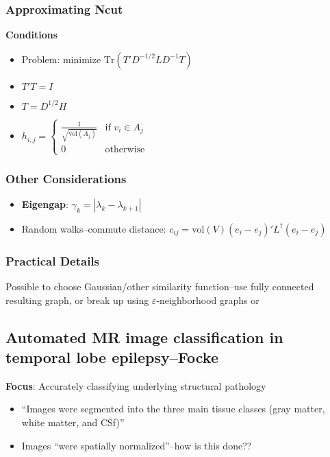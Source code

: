 \documentclass{article}
\begin{document}
        \subsubsection{Approximating Ncut}
            
            \textbf{Conditions}
            \begin{itemize}            
                \item Problem: minimize \ensuremath{\text{Tr}(T'D^{-1/2}LD^{-1}T)}
                \item \ensuremath{T'T = I}
                \item \ensuremath{T=D^{1/2}H}
                \item \begin{math}
                        h_{i,j} = \left\{
                            \begin{array}{lr}
                            \frac{1}{\sqrt{\text{vol}(A_j)}}&\text{if } v_i \in    
A_j\\
                            0&\text{otherwise}
                            \end{array}\right. 
                \end{math}
            \end{itemize}

        \subsubsection{Other Considerations}
             \begin{itemize}
                    \item \textbf{Eigengap}: \ensuremath{\gamma_k =
|\lambda_k-\lambda_{k+1}|}
                    \item Random walks--commute distance: \ensuremath{ c_{ij} =
\text{vol}(V) (e_i - e_j)' L^{\dagger} (e_i - e_j)}
             \end{itemize}
        \subsubsection{Practical Details}
              Possible to choose Gaussian/other similarity function--use fully
connected resulting graph, or break up using
\ensuremath{\varepsilon}-neighborhood graphs or  
        \subsection{Automated MR image classification in temporal lobe
epilepsy--Focke}
            \textbf{Focus}: Accurately classifying underlying structural
pathology
            \begin{itemize}
                \item ``Images were segmented into the three main tissue classes
(gray matter, white matter, and CSf)''
                \item Images ``were spatially normalized''--how is this done??
            \end{itemize}     
                
\end{document}

